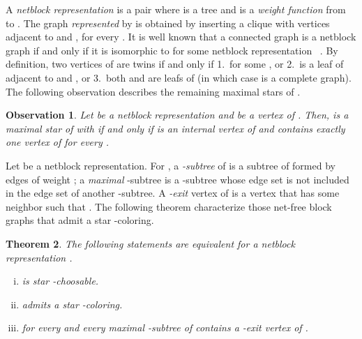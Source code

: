 \documentclass[a4paper, 11pt, oneside]{article}
\newtheorem{theorem}{Theorem}
\newtheorem{observation}[theorem]{Observation}
\let\Definition=\emph
\begin{document}
A \Definition{netblock representation} is a pair  where  is a tree and  is a \Definition{weight function} from  to .  The graph  \Definition{represented} by  is obtained by inserting a clique  with  vertices adjacent to  and , for every .  It is well known that a connected graph is a netblock graph if and only if it is isomorphic to  for some netblock representation ~\cite{BrandstadtLeSpinrad1999}. By definition, two vertices  of  are twins if and only if 1.\  for some , or 2.\  is a leaf of  adjacent to  and , or 3.\ both  and  are leafs of  (in which case  is a complete graph).  The following observation describes the remaining maximal stars of .

\begin{observation}
\label{obs:blockbicliques}
Let  be a netblock representation and  be a vertex of .  Then,  is a maximal star of  with  if and only if  is an internal vertex of  and  contains exactly one vertex of  for every .
\end{observation}

Let  be a netblock representation.  For , a \Definition{-subtree} of  is a subtree of  formed by edges of weight ; a \Definition{maximal} -subtree is a -subtree whose edge set is not included in the edge set of another -subtree.  A \Definition{-exit} vertex of  is a vertex  that has some neighbor  such that .  The following theorem characterize those net-free block graphs that admit a star -coloring.

\begin{theorem}\label{thm:block graph coloring}
The following statements are equivalent for a netblock representation .

\begin{enumerate}[i.]
  \item  is star -choosable.
  \item  admits a star -coloring.
  \item  for every  and every maximal -subtree of  contains a -exit vertex of .
\end{enumerate}
\end{theorem}
\end{document}
